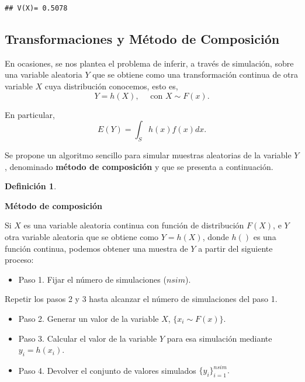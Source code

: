 \documentclass[
]{book}
\providecommand{\tightlist}{%
  \setlength{\itemsep}{0pt}\setlength{\parskip}{0pt}}
\newenvironment{yellowbox}{
  \definecolor{shadecolor}{rgb}{210, 180, 140}  
  \color{black}
  \begin{shaded}}
 {\end{shaded}}
\theoremstyle{definition}
\newtheorem{definition}{Definición}[chapter]
\theoremstyle{definition}
\theoremstyle{definition}
\theoremstyle{definition}
\theoremstyle{remark}
\begin{document}
\begin{verbatim}
## V(X)= 0.5078
\end{verbatim}

\hypertarget{composicionsec}{%
\subsection{Transformaciones y Método de Composición}\label{composicionsec}}

En ocasiones, se nos plantea el problema de inferir, a través de simulación, sobre una variable aleatoria \(Y\) que se obtiene como una transformación continua de otra variable \(X\) cuya distribución conocemos, esto es, \[Y=h(X), \quad \text{ con } X \sim F(x).\]

En particular, \[E(Y)=\int_S h(x) f(x)dx.\]

Se propone un algoritmo sencillo para simular muestras aleatorias de la variable \(Y\), denominado \textbf{método de composición} y que se presenta a continuación.

\begin{yellowbox}

\begin{definition}
\protect\hypertarget{def:metodocomposicion}{}\label{def:metodocomposicion}

\textbf{Método de composición}

Si \(X\) es una variable aleatoria continua con función de distribución \(F(X)\), e \(Y\) otra variable aleatoria que se obtiene como \(Y = h(X)\), donde \(h()\) es una función continua, podemos obtener una muestra de \(Y\) a partir del siguiente proceso:

\begin{itemize}
\tightlist
\item
  Paso 1. Fijar el número de simulaciones (\(nsim\)).
\end{itemize}

Repetir los pasos 2 y 3 hasta alcanzar el número de simulaciones del paso 1.

\begin{itemize}
\tightlist
\item
  Paso 2. Generar un valor de la variable \(X\), \(\{x_i \sim F(x)\}\).\\
\item
  Paso 3. Calcular el valor de la variable \(Y\) para esa simulación mediante \(y_i = h(x_i)\).
\item
  Paso 4. Devolver el conjunto de valores simulados \(\{y_i\}_{i=1}^{nsim}.\)
\end{itemize}

\end{definition}

\end{yellowbox}
\end{document}
